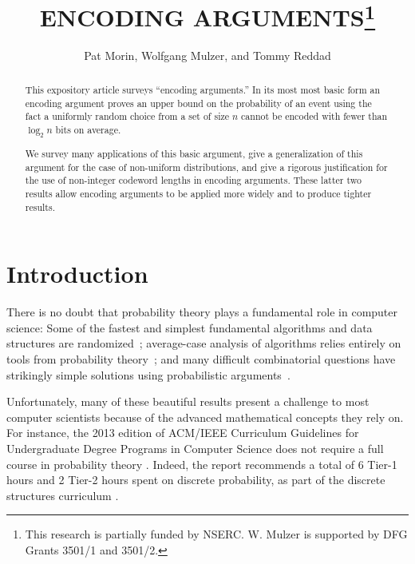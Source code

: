 \documentclass{patmorin}
\title{\MakeUppercase{Encoding Arguments}\thanks{This research is partially funded by NSERC.
W. Mulzer is supported by DFG Grants 3501/1 and 3501/2.}}
\author{Pat Morin, Wolfgang Mulzer, and Tommy Reddad}
\date{}
\begin{document}
\begin{titlepage}
\maketitle


\begin{abstract}
  \setlength{\baselineskip}{15.84pt}

  This expository article surveys ``encoding arguments.'' In its
  most most basic form an encoding argument proves an upper bound on
  the probability of an event using the fact a uniformly random choice
  from a set of size $n$ cannot be encoded with fewer than $\log_2 n$
  bits on average.

  We survey many applications of this basic argument, give a
  generalization of this argument for the case of non-uniform
  distributions, and give a rigorous justification for the use of
  non-integer codeword lengths in encoding arguments.  These latter
  two results allow encoding arguments to be applied more widely and
  to produce tighter results.
\end{abstract}


\end{titlepage}
\tableofcontents
\newpage
{}

\section{Introduction}
\setlength{\baselineskip}{15.84pt}

There is no doubt that probability theory plays a fundamental role in
computer science: Some of the fastest and simplest fundamental
algorithms and data structures are randomized~\cite{mitzenmacher.upfal:probability, motwani.raghavan:randomized}; 
average-case analysis of algorithms relies entirely on tools from probability 
theory~\cite{flajolet.sedgewick:aofa}; and
many difficult combinatorial questions have strikingly simple
solutions using probabilistic arguments~\cite{alon:probabilistic}.

Unfortunately, many of these beautiful results 
present a challenge to
most computer scientists because of
the advanced mathematical concepts they rely on.
For instance, the 2013 edition of ACM/IEEE Curriculum
Guidelines for Undergraduate Degree Programs in Computer Science does
not require a full course in probability theory
\cite[Page~50]{computing-curricula:computer}. Indeed, the report
recommends a total of 6 Tier-1 hours and 2 Tier-2 hours spent on
discrete probability, as part of the discrete structures curriculum
\cite[Page~77]{computing-curricula:computer}.
\end{document}
